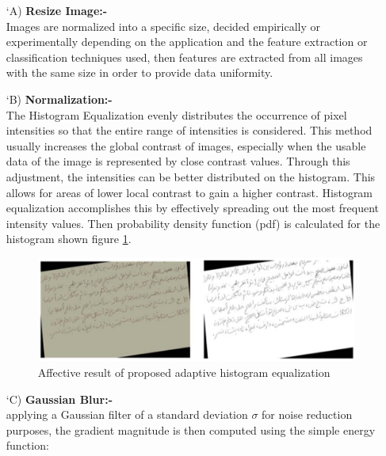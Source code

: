 \begin{itemize}[labelindent=1em,labelsep=0.25cm,leftmargin=*]
        \item[\char `A)] \textbf{Resize Image:-}\\
        Images are normalized into a specific size, decided empirically or experimentally depending on the application and the feature extraction or classification techniques used, then features are extracted from all images  with the same size in order to provide data uniformity. 
        \item[\char `B)] \textbf{Normalization:-}\\  
        The Histogram Equalization \cite{equalization} evenly distributes the occurrence of pixel intensities so that the entire range of intensities is considered. This method usually increases the global contrast of images, especially when the usable data of the image is represented by close contrast values. Through this adjustment, the intensities can be better distributed on the histogram. This allows for areas of lower local contrast to gain a higher contrast. Histogram equalization accomplishes this by effectively spreading out the most frequent intensity values. Then probability density function (pdf) is calculated for the histogram shown figure \ref{fig:equalize}.
        \begin{figure}[!htb]
            \centering
            \includegraphics[width=11cm]{images/equalize.png}
            \caption{Affective result of proposed adaptive histogram equalization}
            \label{fig:equalize}
        \end{figure}
        \item[\char `C)] \textbf{Gaussian Blur:-}\\ 
        applying a Gaussian filter of a standard deviation   $\sigma$ for noise
        reduction purposes, the gradient magnitude is then computed using the
        simple energy function:
        

\end{itemize}
